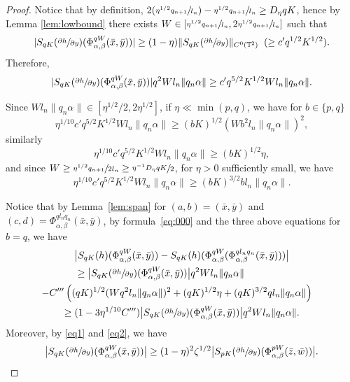 \documentclass[JEP,XML,SOM,Unicode,NoEqCountersInSection]{cedram}
\newcommand{\Psfrac}[2]{(\sfrac{#1}{#2})}
\theoremstyle{definition}
\theoremstyle{plain}
\newcommand\TT{\mathbb{T}}
\begin{document}
\begin{proof}
Notice that by definition,
$2\Psfrac{\eta^{1/2}q_{n+1}}{l_n}-\sfrac{\eta^{1/2}q_{n+1}}{l_n}\geq D_\eta qK$, hence
by Lemma \ref{lem:lowbound} there exists $W\in [\sfrac{\eta^{1/2}q_{n+1}}{l_n},2\sfrac{\eta^{1/2}q_{n+1}}{l_n}]$ such that
\begin{equation}\label{eq1}
|S_{qK}(\sfrac{\partial h}{\partial y})(\Phi_{\alpha,\beta}^{qW}(\bar{x},\bar{y}))|\geq (1-\eta)\|S_{qK}(\sfrac{\partial h}{\partial y})\|_{C^0(\TT^2) }\;\; (\geq c' q^{1/2}K^{1/2}).
\end{equation}
Therefore,
\begin{equation}\label{eq:000}
|S_{qK}(\sfrac{\partial h}{\partial y})(\Phi_{\alpha,\beta}^{qW}(\bar{x},\bar{y}))|
q^2Wl_n\|q_n\alpha\|\geq c'q^{5/2}K^{1/2}Wl_n\|q_n\alpha\|.
\end{equation}

Since $Wl_n\|q_n\alpha\|\in [\eta^{1/2}/2, 2\eta^{1/2}]$, if $\eta\ll \min(p,q)$, we have for $b\in\{p,q\}$
\[
\eta^{1/10} c'q^{5/2}K^{1/2}Wl_n\|q_n\alpha\|\geq (bK)^{1/2}(Wb^2l_n\|q_n\alpha\|)^2,
\]
similarly
\[
\eta^{1/10} c'q^{5/2}K^{1/2}Wl_n\|q_n\alpha\| \geq (bK)^{1/2}\eta,
\]
and since $W\geq \sfrac{\eta^{1/2}q_{n+1}}{2l_n}\geq \sfrac{\eta^{-1} D_\eta qK}{2}$, for $\eta>0$ sufficiently small, we have
\[
\eta^{1/10} c'q^{5/2}K^{1/2}Wl_n\|q_n\alpha\|\geq (bK)^{3/2}bl_n\|q_n\alpha\|.
\]

Notice that by Lemma~\ref{lem:span} for $(a,b)=(\bar{x},\bar{y})$ and $(c,d)=\Phi_{\alpha,\beta}^{ql_nq_n}(\bar{x},\bar{y})$, by formula~\eqref{eq:000} and the three above equations for $b=q$, we have\vspace*{-5pt}
\begin{multline*}
\bigl\vert S_{qK}(h)(\Phi_{\alpha,\beta}^{qW}(\bar{x},\bar{y})) - S_{qK}(h)(\Phi_{\alpha,\beta}^{qW}(\Phi_{\alpha,\beta}^{ql_nq_n}(\bar{x},\bar{y})))\bigr\vert \\
\hspace*{-1.5cm}\geq
\bigl\vert S_{qK}(\sfrac{\partial h}{\partial y})(\Phi_{\alpha,\beta}^{qW}(\bar{x},\bar{y}))\bigr\vert q^2W l_n \|q_n \alpha \| \\
\shoveright{- C''' \left( (q K)^{1/2}(Wq^2 l_n \Vert q_n \alpha \Vert )^2+(q K)^{1/2} \eta + (q K)^{3/2} q l_n\Vert q_n \alpha \Vert \right)}
\\ \geq (1-3\eta^{1/10}C''')\bigl| S_{qK}(\sfrac{\partial h}{\partial y})(\Phi_{\alpha,\beta}^{qW}(\bar{x},\bar{y}))\bigr| q^2Wl_n\|q_n\alpha\|.
\end{multline*}
Moreover, by \eqref{eq1} and \eqref{eq2}, we have
\[
\bigl|S_{qK}(\sfrac{\partial h}{\partial y})(\Phi_{\alpha,\beta}^{qW}(\bar{x},\bar{y}))\bigr|
\geq (1-\eta)^2\zeta^{1/2}
\bigl|S_{pK}(\sfrac{\partial h}{\partial y})(\Phi_{\alpha,\beta}^{pW}(\bar{z},\bar{w}))\bigr|.
\]


\end{proof}
\end{document}
